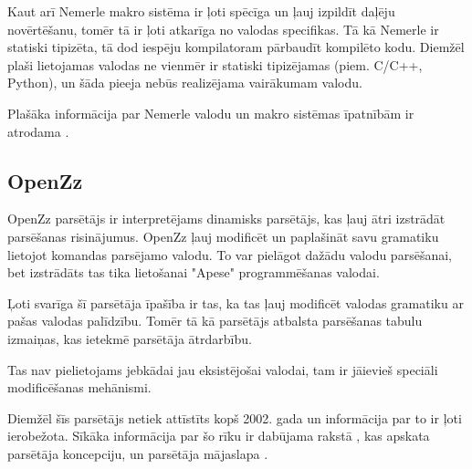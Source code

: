 Kaut arī Nemerle makro sistēma ir ļoti spēcīga un ļauj izpildīt daļēju novērtēšanu, tomēr tā ir ļoti atkarīga no valodas specifikas. Tā kā Nemerle ir statiski tipizēta, tā dod iespēju kompilatoram pārbaudīt kompilēto kodu. Diemžēl plaši lietojamas valodas ne vienmēr ir statiski tipizējamas (piem. C/C++, Python), un šāda pieeja nebūs realizējama vairākumam valodu.

Plašāka informācija par Nemerle valodu un makro sistēmas īpatnībām ir atrodama \cite{NemerleWiki}.


\subsection{\label{sbs:rel_openzz}OpenZz}

OpenZz parsētājs ir interpretējams dinamisks parsētājs, kas ļauj ātri izstrādāt parsēšanas risinājumus. OpenZz ļauj modificēt un paplašināt savu gramatiku lietojot komandas parsējamo valodu. To var pielāgot dažādu valodu parsēšanai, bet izstrādāts tas tika lietošanai "Apese" programmēšanas valodai.

Ļoti svarīga šī parsētāja īpašība ir tas, ka tas ļauj modificēt valodas gramatiku ar pašas valodas palīdzību. Tomēr tā kā parsētājs atbalsta parsēšanas tabulu izmaiņas, kas ietekmē parsētāja ātrdarbību.

Tas nav pielietojams jebkādai jau eksistējošai valodai, tam ir jāievieš speciāli modificēšanas mehānismi.

Diemžēl šīs parsētājs netiek attīstīts kopš 2002. gada un informācija par to ir ļoti ierobežota. Sīkāka informācija par šo rīku ir dabūjama rakstā \cite{Cabasino:DynamicParsers}, kas apskata parsētāja koncepciju, un parsētāja mājaslapa \cite{OpenZZParser}. 

